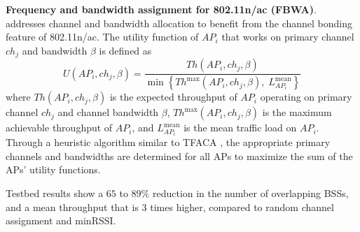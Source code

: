 

\label{FBWA}
\textbf{Frequency and bandwidth assignment for 802.11n/ac (FBWA)}.
\cite{CA-BW-VTC-14} addresses channel and bandwidth allocation to benefit from the channel bonding feature of 802.11n/ac. 
The utility function of $AP_i$ that works on primary channel $ch_{j}$ and bandwidth $\beta$ is defined as
%
\begin{equation}
U(AP_{i}, ch_{j}, \beta)=\frac{Th(AP_{i}, ch_{j}, \beta)} {\min \left\{ Th^{\mathrm{max}}(AP_{i}, ch_{j}, \beta),\; L_{AP_{i}}^{\mathrm{mean}}   \right\} } 
\end{equation}
where $Th(AP_{i}, ch_{j}, \beta)$ is the expected throughput of $AP_i$ operating on primary channel $ch_{j}$ and channel bandwidth $\beta$,
 $Th^{\mathrm{max}}(AP_{i}, ch_{j}, \beta)$ is the maximum achievable throughput of $AP_i$, and $L_{AP_{i}}^{\mathrm{mean}}$ is the mean traffic load on $AP_i$. 
Through a heuristic algorithm similar to TFACA \cite{CA-VTC-14}, the appropriate primary channels and bandwidths are determined for all APs to maximize the sum of the APs' utility functions.

Testbed results show a $65$ to $89\%$ reduction in the number of overlapping BSSs, and a mean throughput that is 3 times higher, compared to random channel assignment and minRSSI. 


